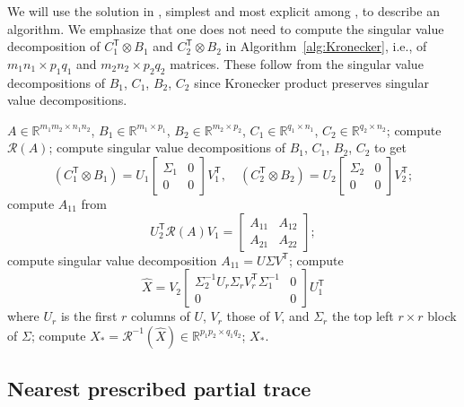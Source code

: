 \documentclass[11pt,reqno]{amsart}
\newcommand{\tp}{{\scriptscriptstyle\mathsf{T}}}
\theoremstyle{definition}
\numberwithin{equation}{section}
\newcommand{\R}{\mathbb{R}}
\begin{document}
We will use the solution in \cite{li22}, simplest and most explicit among \cite{Sondermann, Fri, li22}, to describe an algorithm. We emphasize that one does not need to compute the singular value decomposition of $C_1^\tp \otimes B_1$ and $C_2^\tp \otimes B_2$ in Algorithm~\ref{alg:Kronecker}, i.e., of $m_1n_1 \times p_1q_1$ and $m_2n_2 \times p_2q_2$ matrices. These follow from the singular value decompositions of $B_1$, $C_1$, $B_2$, $C_2$ since Kronecker product preserves singular value decompositions.

\begin{algorithm}[htb!]
    \caption{Generalized Kronecker rank-$r$ nearness} \label{alg:Kronecker}
    \begin{algorithmic}[1]
    \Require $A \in \R^{m_1m_2 \times n_1n_2}$, $B_1 \in \R^{m_1 \times p_1}$, $B_2 \in \R^{m_2 \times p_2}$, $C_1 \in \R^{q_1 \times n_1}$, $C_2 \in \R^{q_2 \times n_2}$;
    \State compute $\mathcal{R}(A)$;
    \State compute singular value decompositions  of $B_1$, $C_1$, $B_2$, $C_2$ to get
    \[(C_1^\tp \otimes B_1) = U_1 \begin{bmatrix}
        \Sigma_1 &0\\ 0 &0
    \end{bmatrix} V_1^\tp,\quad (C_2^\tp \otimes B_2) = U_2 \begin{bmatrix}
        \Sigma_2 &0\\ 0 &0
    \end{bmatrix} V_2^\tp;\]
    \State compute $A_{11}$ from 
    \[U_2^\tp \mathcal{R}(A)V_1 = \begin{bmatrix}
        A_{11} & A_{12} \\
        A_{21} & A_{22}
    \end{bmatrix};\]
    \State compute singular value decomposition $A_{11} = U\Sigma V^\tp$;
    \State compute 
    \[\widehat{X} = V_2 \begin{bmatrix}
        \Sigma_2^{-1} U_r\Sigma_r V_r^\tp \Sigma_1^{-1} &0\\ 0 &0
    \end{bmatrix} U_1^\tp\]
    where $U_r$ is the first $r$ columns of $U$, $V_r$ those of $V$, and $\Sigma_r$ the top left $r\times r$ block of $\Sigma$;
    \State compute $X_* =  \mathcal{R}^{-1}(\widehat{X}) \in \R^{p_1p_2 \times q_1q_2}$;
    \Ensure $X_*$.
    \end{algorithmic}
\end{algorithm}


\subsection{Nearest prescribed partial trace}\label{sec:partial-trace}
\end{document}
